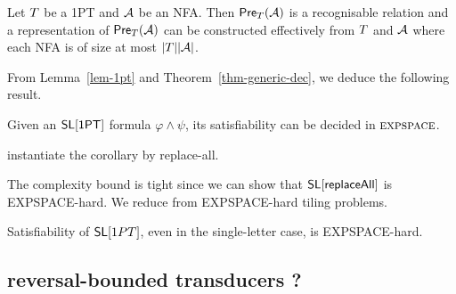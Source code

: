 \begin{lemma}\label{lem-1pt}
Let $T$ be a 1PT and $\mathcal{A}$ be an NFA. Then $\textsf{Pre}_{T}(\mathcal{A})$ is a recognisable relation and a representation of $\textsf{Pre}_{T}(\mathcal{A})$ can be constructed effectively from $T$ and $\mathcal{A}$ where each NFA is of size at most $|T||\mathcal{A}|$.
\end{lemma}

From Lemma~\ref{lem-1pt} and Theorem~\ref{thm-generic-dec}, we deduce the following result.
%
\begin{corollary}
Given an $\textsf{SL}[\textsf{1PT}]$ formula $\varphi \wedge \psi$, its satisfiability can be decided in $\textsc{expspace}$. 
\end{corollary}

\begin{remark}
	instantiate the corollary by replace-all. 
\end{remark}

The complexity bound is tight since we can show that $\mathsf{SL}[\mathsf{replaceAll}]$ is EXPSPACE-hard. We reduce from EXPSPACE-hard tiling problems.  

%


\begin{theorem}
	Satisfiability of $\mathsf{SL}[1PT]$, even in the single-letter case, is EXPSPACE-hard.
\end{theorem}



\subsection{reversal-bounded transducers ?}

